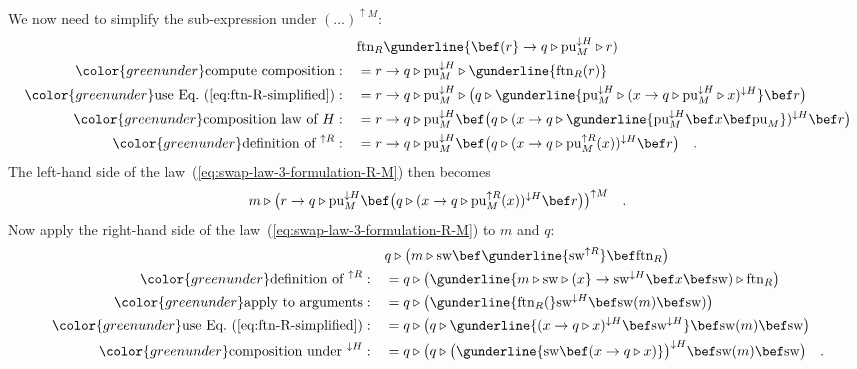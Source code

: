 We now need to simplify the sub-expression under $(...)^{\uparrow M}$:
\begin{align*}
 & \text{ftn}_{R}\gunderline{\bef(r}\rightarrow q\triangleright\text{pu}_{M}^{\downarrow H}\triangleright r)\\
{\color{greenunder}\text{compute composition}:}\quad & =r\rightarrow q\triangleright\text{pu}_{M}^{\downarrow H}\triangleright\gunderline{\text{ftn}_{R}(r)}\\
{\color{greenunder}\text{use Eq.~(\ref{eq:ftn-R-simplified})}:}\quad & =r\rightarrow q\triangleright\text{pu}_{M}^{\downarrow H}\triangleright\big(q\triangleright\gunderline{\text{pu}_{M}^{\downarrow H}\triangleright(x\rightarrow q\triangleright\text{pu}_{M}^{\downarrow H}\triangleright x)^{\downarrow H}}\bef r\big)\\
{\color{greenunder}\text{composition law of }H:}\quad & =r\rightarrow q\triangleright\text{pu}_{M}^{\downarrow H}\bef\big(q\triangleright(x\rightarrow q\triangleright\gunderline{\text{pu}_{M}^{\downarrow H}\bef x\bef\text{pu}_{M}})^{\downarrow H}\bef r\big)\\
{\color{greenunder}\text{definition of }^{\uparrow R}:}\quad & =r\rightarrow q\triangleright\text{pu}_{M}^{\downarrow H}\bef\big(q\triangleright(x\rightarrow q\triangleright\text{pu}_{M}^{\uparrow R}(x))^{\downarrow H}\bef r\big)\quad.
\end{align*}
The left-hand side of the law~(\ref{eq:swap-law-3-formulation-R-M})
then becomes
\[
m\triangleright\big(r\rightarrow q\triangleright\text{pu}_{M}^{\downarrow H}\bef\big(q\triangleright(x\rightarrow q\triangleright\text{pu}_{M}^{\uparrow R}(x))^{\downarrow H}\bef r\big)\big)^{\uparrow M}\quad.
\]
Now apply the right-hand side of the law~(\ref{eq:swap-law-3-formulation-R-M})
to $m$ and $q$:
\begin{align}
 & q\triangleright\big(m\triangleright\text{sw}\bef\gunderline{\text{sw}^{\uparrow R}}\bef\text{ftn}_{R}\big)\nonumber \\
{\color{greenunder}\text{definition of }^{\uparrow R}:}\quad & =q\triangleright\big(\gunderline{m\triangleright\text{sw}\triangleright(x}\rightarrow\text{sw}^{\downarrow H}\bef x\bef\text{sw})\triangleright\text{ftn}_{R}\big)\nonumber \\
{\color{greenunder}\text{apply to arguments}:}\quad & =q\triangleright\big(\gunderline{\text{ftn}_{R}(}\text{sw}^{\downarrow H}\bef\text{sw}(m)\bef\text{sw})\big)\nonumber \\
{\color{greenunder}\text{use Eq.~(\ref{eq:ftn-R-simplified})}:}\quad & =q\triangleright\big(q\triangleright\gunderline{(x\rightarrow q\triangleright x)^{\downarrow H}\bef\text{sw}^{\downarrow H}}\bef\text{sw}(m)\bef\text{sw}\big)\nonumber \\
{\color{greenunder}\text{composition under }^{\downarrow H}:}\quad & =q\triangleright\big(q\triangleright\big(\gunderline{\text{sw}\bef(x\rightarrow q\triangleright x)}\big)^{\downarrow H}\bef\text{sw}(m)\bef\text{sw}\big)\quad.\label{eq:swap-laws-derivation2}
\end{align}
